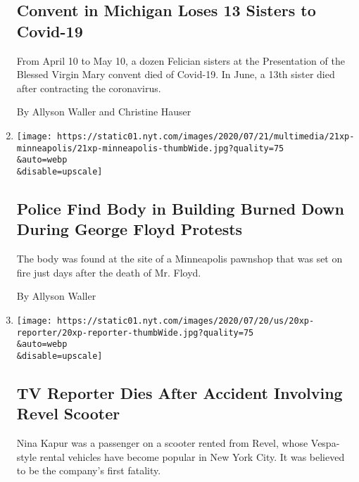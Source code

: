 \begin{enumerate}
  \hypertarget{convent-in-michigan-loses-13-sisters-to-covid-19}{%
  \subsection{Convent in Michigan Loses 13 Sisters to
  Covid-19}\label{convent-in-michigan-loses-13-sisters-to-covid-19}}

  From April 10 to May 10, a dozen Felician sisters at the Presentation
  of the Blessed Virgin Mary convent died of Covid-19. In June, a 13th
  sister died after contracting the coronavirus.

  By Allyson Waller and Christine Hauser
\item
  \href{/2020/07/21/us/body-minneapolis-protests-floyd.html}{}

  \texttt{[image: https://static01.nyt.com/images/2020/07/21/multimedia/21xp-minneapolis/21xp-minneapolis-thumbWide.jpg?quality=75\\\&auto=webp\\\&disable=upscale]}

  \hypertarget{police-find-body-in-building-burned-down-during-george-floyd-protests}{%
  \subsection{Police Find Body in Building Burned Down During George
  Floyd
  Protests}\label{police-find-body-in-building-burned-down-during-george-floyd-protests}}

  The body was found at the site of a Minneapolis pawnshop that was set
  on fire just days after the death of Mr. Floyd.

  By Allyson Waller
\item
  \href{/2020/07/20/nyregion/revel-scooter-nina-kapur-dead.html}{}

  \texttt{[image: https://static01.nyt.com/images/2020/07/20/us/20xp-reporter/20xp-reporter-thumbWide.jpg?quality=75\\\&auto=webp\\\&disable=upscale]}

  \hypertarget{tv-reporter-dies-after-accident-involving-revel-scooter}{%
  \subsection{TV Reporter Dies After Accident Involving Revel
  Scooter}\label{tv-reporter-dies-after-accident-involving-revel-scooter}}

  Nina Kapur was a passenger on a scooter rented from Revel, whose
  Vespa-style rental vehicles have become popular in New York City. It
  was believed to be the company's first fatality.


\end{enumerate}
